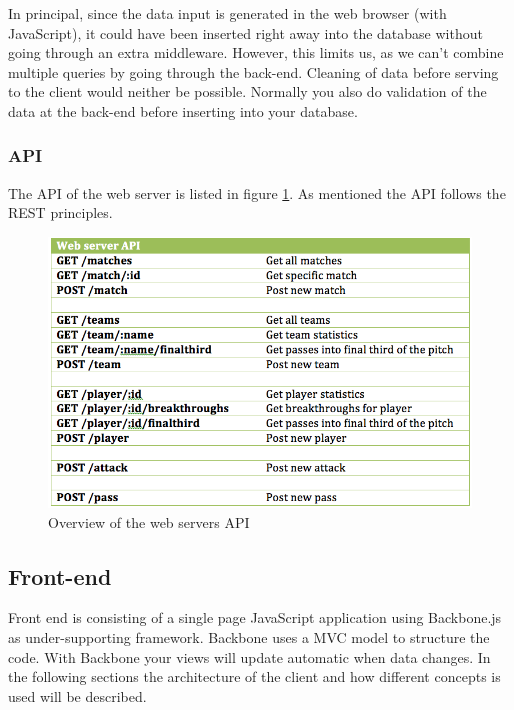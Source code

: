 In principal, since the data input is generated in the web browser (with JavaScript), it could have been inserted right away into the database without going through an extra middleware. However, this limits us, as we can’t combine multiple queries by going through the back-end. Cleaning of data before serving to the client would neither be possible. Normally you also do validation of the data at the back-end before inserting into your database.

\subsubsection{API}

The API of the web server is listed in figure \ref{fig:api}. As mentioned the API follows the REST principles. 

\begin{figure}[ht!]
\centering
\includegraphics[width=1\textwidth]{images/implementation/API.png}
\caption{Overview of the web servers API}
\label{fig:api}
\end{figure}

\subsection{Front-end}

Front end is consisting of a single page JavaScript application using Backbone.js \footnotemark as under-supporting framework. Backbone uses a MVC model to structure the code. With Backbone your views will update automatic when data changes. In the following sections the architecture of the client and how different concepts is used will be described. 


